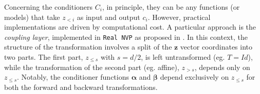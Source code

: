 \documentclass[fleqn,usenatbib]{mnras}
\DeclareMathOperator{\diag}{diag}
\begin{document}
Concerning the conditioners $C_i$, in principle, they can be any functions (or models) that take $z_{<i}$ as input and output $c_i$. However, practical implementations are driven by computational cost. A particular approach is the \textit{coupling layer}, implemented in \texttt{Real NVP}
as proposed in \citep{DinhKB14, DinhSB17}. 
%
%
{\color{red} In this context, the structure of the transformation involves a split of the $\bm{z}$ vector coordinates into two parts. The first part, $z_{\leq s}$ with $s=d/2$, is left untransformed (eg. $T=Id$), while the transformation of the second part (eg. affine), $z_{>s}$, depends only on $z_{\leq s}$. Notably, the conditioner functions $\bm{\alpha}$ and $\bm{\beta}$ depend exclusively on $z_{\leq s}$ for both the forward and backward transformations. 
}
\end{document}
